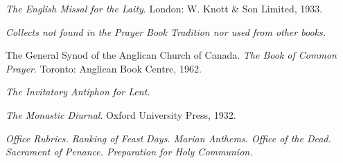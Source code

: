 \vspace{0.5\baselineskip}

\textit{The English Missal for the Laity}. London: W. Knott \& Son Limited, 1933.\par\noindent
\textit{Collects not found in the Prayer Book Tradition nor used from other books.}

\vspace{0.5\baselineskip}

The General Synod of the Anglican Church of Canada. \textit{The Book of Common Prayer}. Toronto: Anglican Book Centre, 1962.\par\noindent
\textit{The Invitatory Antiphon for Lent.}

\vspace{0.5\baselineskip}

\textit{The Monastic Diurnal}. Oxford University Press, 1932.\par\noindent
\textit{Office Rubrics. Ranking of Feast Days. Marian Anthems. Office of the Dead. Sacrament of Penance. Preparation for Holy Communion.}